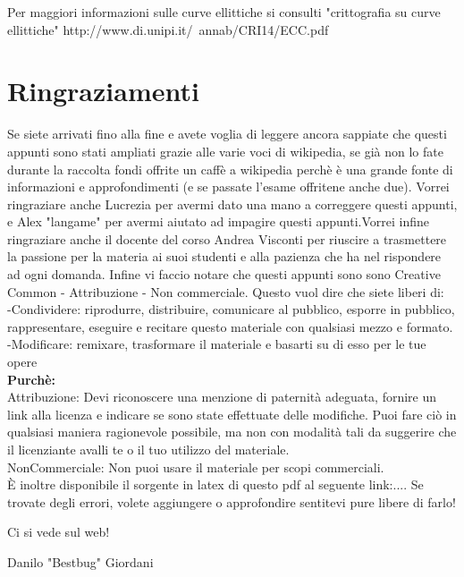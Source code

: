 \documentclass[10pt,a4paper]{article}
\begin{document}
Per maggiori informazioni sulle curve ellittiche si consulti "crittografia su curve ellittiche" http://www.di.unipi.it/~annab/CRI14/ECC.pdf

\section{Ringraziamenti}
Se siete arrivati fino alla fine e avete voglia di leggere ancora sappiate che questi appunti sono stati ampliati grazie alle varie voci di wikipedia, se già non lo fate durante la raccolta fondi offrite un caffè a wikipedia perchè è una grande fonte di informazioni e approfondimenti (e se passate l'esame offritene anche due). Vorrei ringraziare anche Lucrezia per avermi dato una mano a correggere questi appunti, e Alex "langame" per avermi aiutato ad impagire questi appunti.Vorrei infine ringraziare anche il docente del corso Andrea Visconti per riuscire a trasmettere la passione per la materia ai suoi studenti e alla pazienza che ha nel rispondere ad ogni domanda. Infine vi faccio notare che questi appunti sono sono Creative Common - Attribuzione - Non commerciale. Questo vuol dire che siete liberi di:\\
-Condividere: riprodurre, distribuire, comunicare al pubblico, esporre in pubblico, rappresentare, eseguire e recitare questo materiale con qualsiasi mezzo e formato.\\
-Modificare: remixare, trasformare il materiale e basarti su di esso per le tue opere \\
\textbf{Purchè:}\\
Attribuzione: Devi riconoscere una menzione di paternità adeguata, fornire un link alla licenza e indicare se sono state effettuate delle modifiche. Puoi fare ciò in qualsiasi maniera ragionevole possibile, ma non con modalità tali da suggerire che il licenziante avalli te o il tuo utilizzo del materiale. \\
NonCommerciale: Non puoi usare il materiale per scopi commerciali. \\

È inoltre disponibile il sorgente in latex di questo pdf al seguente link:.... Se trovate degli errori, volete aggiungere o approfondire sentitevi pure libere di farlo!

Ci si vede sul web!

Danilo "Bestbug" Giordani
\end{document}
